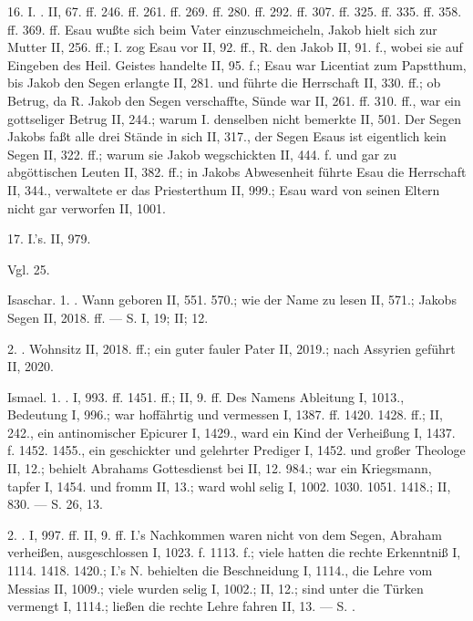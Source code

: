 16. I. . II, 67. ff. 246. ff. 261. ff. 269. ff. 280. ff. 292. ff. 307. ff. 325. ff. 335. ff. 358. ff. 369. ff. Esau wußte sich beim Vater einzuschmeicheln, Jakob hielt sich zur Mutter II, 256. ff.; I. zog Esau vor II, 92. ff., R. den Jakob II, 91. f., wobei sie auf Eingeben des Heil. Geistes handelte II, 95. f.; Esau war Licentiat zum Papstthum, bis Jakob den Segen erlangte II, 281. und führte die Herrschaft II, 330. ff.; ob Betrug, da R. Jakob den Segen verschaffte, Sünde war II, 261. ff. 310. ff., war ein
gottseliger Betrug II, 244.; warum I. denselben nicht bemerkte II, 501. Der Segen Jakobs faßt alle drei Stände in sich II, 317., der Segen Esaus ist eigentlich kein Segen II, 322. ff.; warum sie Jakob wegschickten II, 444. f. und gar zu abgöttischen Leuten II, 382. ff.; in Jakobs Abwesenheit führte Esau die Herrschaft II, 344., verwaltete er das Priesterthum II, 999.; Esau ward von seinen Eltern nicht gar verworfen II, 1001.

17.  I.’s. II, 979.

Vgl.  25.

Isaschar. 1. . Wann geboren II, 551. 570.; wie der Name zu lesen II, 571.; Jakobs Segen II, 2018. ff. — S.  I, 19; II;  12.

2. . Wohnsitz II, 2018. ff.; ein guter fauler Pater II, 2019.; nach Assyrien geführt II, 2020.

Ismael. 1. . I, 993. ff. 1451. ff.; II, 9. ff. Des Namens Ableitung I, 1013., Bedeutung I, 996.; war hoffährtig und vermessen I, 1387. ff. 1420. 1428. ff.; II, 242., ein antinomischer Epicurer I, 1429., ward ein Kind der Verheißung I, 1437. f. 1452. 1455., ein geschickter und gelehrter Prediger I, 1452. und großer Theologe II, 12.; behielt Abrahams Gottesdienst bei II, 12. 984.; war ein Kriegsmann, tapfer I, 1454. und fromm II, 13.; ward wohl selig I, 1002. 1030. 1051. 1418.; II, 830. — S.  26,  13.

2. . I, 997. ff. II, 9. ff. I.’s Nachkommen waren nicht von dem Segen, Abraham verheißen, ausgeschlossen I, 1023. f. 1113. f.; viele hatten die rechte Erkenntniß I, 1114. 1418. 1420.; I.’s N. behielten die Beschneidung I, 1114., die Lehre vom Messias II, 1009.; viele wurden selig I, 1002.; II, 12.; sind unter die Türken vermengt I, 1114.; ließen die rechte Lehre fahren II, 13. — S. .

